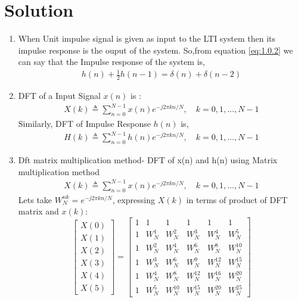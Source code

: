 \documentclass[journal,12pt,twocolumn]{IEEEtran}
\renewcommand\thesection{\arabic{section}}
\begin{document}
\section{Solution}
\begin{enumerate}[label=\thesection.\arabic*.,ref=\thesection.\theenumi]
\item
When Unit impulse signal is given as input to the LTI system then its impulse response is the ouput of the system.
So,from equation \eqref{eq:1.0.2} we can say that the Impulse response of the system is,
\begin{align}
    h(n) + \frac{1}{2}h(n-1) = \delta(n) + \delta(n-2)	
\end{align}

\item DFT of a Input Signal $x(n)$ is :
\begin{align}
    X(k) \triangleq \sum_{n=0}^{N-1}x(n)e^{-j2\pi kn/N},\quad k=0,1, \ldots, N-1 \label{eq:2.0.2}
\end{align}
Similarly, DFT of Impulse Response $h(n)$ is,
\begin{align}
    H(k) \triangleq \sum_{n=0}^{N-1}h(n)e^{-j2\pi kn/N},\quad k=0,1, \ldots, N-1 \label{eq:2.0.3}
\end{align}
\item
Dft matrix multiplication method- DFT of x(n) and h(n) using Matrix multiplication method
\\
\begin{align}
    X(k) \triangleq \sum_{n=0}^{N-1}x(n)e^{-j2\pi kn/N},\quad k=0,1, \ldots, N-1
\end{align}
Lets take $W_N^{nk}=e^{-j2\pi kn/N} $,
expressing $X(k)$ in terms of product of DFT matrix and $x(k)$:
\begin{equation}
 \begin{bmatrix} X(0) \\ X(1) \\ X(2) \\ X(3) \\ X(4) \\ X(5) \end{bmatrix}
=
\begin{bmatrix}
1 & 1 & 1 & 1 & 1 & 1 \\ 1 & W_N^1& W_N^2& W_N^3 & W_N^4 & W_N^5\\1 & W_N^2 & W_N^4 & W_N^6 & W_N^8 & W_N^{10}\\1 & W_N^3 & W_N^6 & W_N^9 & W_N^{12} & W_N^{15}\\1 & W_N^4 & W_N^8 & W_N^{12} & W_N^{16} & W_N^{20}\\1 & W_N^5 & W_N^{10} & W_N^{15} & W_N^{20} &W_N^{25}

\end{bmatrix}
\end{equation}
\end{enumerate}
\end{document}
